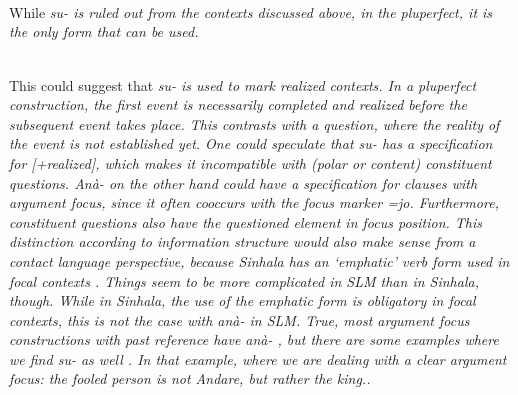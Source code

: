  \\

 \\

 \\

While \em su- \em is ruled out from the contexts discussed above, in the pluperfect, it is the only form that can be used.


 \\
This could suggest that \em su- \em is used to mark realized contexts. In a pluperfect construction, the first event is necessarily completed and realized before the subsequent event takes place. This contrasts with a question, where the reality of the event is not established yet. One could speculate that \em su- \em has a specification for [+realized], which makes it incompatible with (polar or content) constituent questions. \em Anà- \em on the other hand could have a specification for clauses with argument focus, since it often cooccurs with the focus marker \em =jo\em. Furthermore, constituent questions also have the questioned element in focus position. This distinction   according to information structure would also make sense from a contact language perspective, because Sinhala has an `emphatic' verb form used in focal contexts \citep{Gair1985calque}. Things seem to be more complicated in SLM than in Sinhala, though. While in Sinhala, the use of the emphatic form is obligatory in focal contexts, this is not the case with \em anà- \em in SLM. True, most argument focus constructions with past reference have \em anà- \em {} , but there are some examples where we find \em su- \em as well . In that example, where we are dealing with a clear argument focus: the fooled person is not Andare, but rather the king..
 
